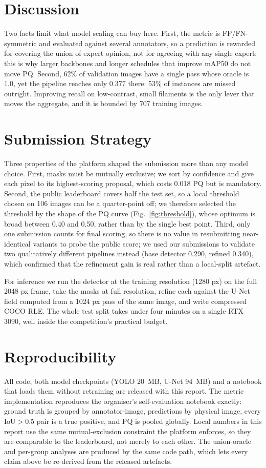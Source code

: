 \documentclass[conference]{IEEEtran}
\begin{document}
\section{Discussion}
Two facts limit what model scaling can buy here. First, the metric is FP/FN-symmetric and evaluated against several annotators, so a prediction is rewarded for covering the union of expert opinion, not for agreeing with any single expert; this is why larger backbones and longer schedules that improve mAP50 do not move PQ. Second, 62\% of validation images have a single pass whose oracle is 1.0, yet the pipeline reaches only 0.377 there: 53\% of instances are missed outright. Improving recall on low-contrast, small filaments is the only lever that moves the aggregate, and it is bounded by 707 training images.
\section{Submission Strategy}
Three properties of the platform shaped the submission more than any model
choice. First, masks must be mutually exclusive; we sort by confidence and give
each pixel to its highest-scoring proposal, which costs 0.018 PQ but is
mandatory. Second, the public leaderboard covers half the test set, so a local
threshold chosen on 106 images can be a quarter-point off; we therefore selected
the threshold by the shape of the PQ curve (Fig.~\ref{fig:threshold}), whose
optimum is broad between 0.40 and 0.50, rather than by the single best point.
Third, only one submission counts for final scoring, so there is no value in
resubmitting near-identical variants to probe the public score; we used our
submissions to validate two qualitatively different pipelines instead (base
detector 0.290, refined 0.340), which confirmed that the refinement gain is real
rather than a local-split artefact.

For inference we run the detector at the training resolution (1280 px) on the
full 2048 px frame, take the masks at full resolution, refine each against the
U-Net field computed from a 1024 px pass of the same image, and write compressed
COCO RLE. The whole test split takes under four minutes on a single RTX 3090,
well inside the competition's practical budget.
\section{Reproducibility}
All code, both model checkpoints (YOLO 20~MB, U-Net 94~MB) and a notebook that
loads them without retraining are released with this report. The metric
implementation reproduces the organiser's self-evaluation notebook exactly:
ground truth is grouped by annotator-image, predictions by physical image, every
IoU$>$0.5 pair is a true positive, and PQ is pooled globally. Local numbers in
this report use the same mutual-exclusion constraint the platform enforces, so
they are comparable to the leaderboard, not merely to each other. The
union-oracle and per-group analyses are produced by the same code path, which
lets every claim above be re-derived from the released artefacts.
\end{document}
